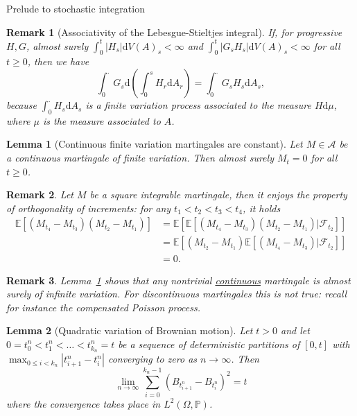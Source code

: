 \documentclass[a4paper]{article}
\theoremstyle{mytheoremstyle}
\newtheorem{lemma}{Lemma}
\newtheorem*{remark}{Remark}
\newcommand{\1}{\mathds{1}}
\begin{document}
\begin{multicols*}{3}
\begin{roundbox}{Prelude to stochastic integration}
\begin{remark}[Associativity of the Lebesgue-Stieltjes integral]
  \label{rem:associativity.lebesgue-stieltjes}If, for progressive $H, G$,
  almost surely $\int_0^t |H_s | \mathrm{d} V (A)_s < \infty$ and $\int_0^t |G_s
  H_s | \mathrm{d} V (A)_s < \infty$ for all $t \geqslant 0$, then we have
  \[ \int_0^{\cdot} G_s \mathrm{d} \left( \int_0^s H_r \mathrm{d} A_r \right) =
     \int_0^{\cdot} G_s H_s \mathrm{d} A_s, \]
  because $\int_0^{\cdot} H_s \mathrm{d} A_s$ is a finite variation process
  associated to the measure $H \mathrm{d} \mu$, where $\mu$ is the measure
  associated to $A$.
\end{remark}

\begin{lemma}[Continuous finite variation martingales are constant]
  \label{lem:mart not fv}Let $M \in \mathcal{A}$ be a continuous martingale of
  finite variation. Then almost surely $M_t = 0$ for all $t \geqslant 0$.
\end{lemma}

\begin{remark}
  \label{rem:mart.orthogonal.increments}Let $M$ be a square integrable
  martingale, then it enjoys the property of \textit{orthogonality of
  increments}: for any $t_1 < t_2 < t_3 < t_4$, it holds
  {
  \small
  \begin{align*}
    \mathbb{E} [(M_{t_4} - M_{t_3}) (M_{t_2} - M_{t_1})] & =\mathbb{E}
    [\mathbb{E} [(M_{t_4} - M_{t_3}) (M_{t_2} - M_{t_1}) |
    \mathcal{F}_{t_2}]]\\
    & =\mathbb{E} [(M_{t_2} - M_{t_1}) \mathbb{E} [(M_{t_4} - M_{t_3}) |
    \mathcal{F}_{t_2}]]\\
    & = 0.
  \end{align*}
  }
\end{remark}

\begin{remark}
  Lemma~\ref{lem:mart not fv} shows that any nontrivial
  {\underline{continuous}} martingale is almost surely of infinite variation.
  For discontinuous martingales this is not true: recall for instance the
  compensated Poisson process.
\end{remark}

\begin{lemma}[Quadratic variation of Brownian motion]
  \label{lem:Brownian-qv}Let $t > 0$ and let $0 = t^n_0 < t^n_1 < \ldots <
  t^n_{k_n} = t$ be a sequence of deterministic partitions of $[0, t]$ with
  $\max_{0 \leqslant i < k_n} |t^n_{i + 1} - t^n_i |$ converging to zero as $n
  \rightarrow \infty$. Then
  \[ \lim_{n \rightarrow \infty}  \sum_{i = 0}^{k_n - 1} (B_{t^n_{i + 1}} -
     B_{t^n_i})^2 = t \]
  where the convergence takes place in $L^2 (\Omega, \mathbb{P})$.
  

\end{lemma}
\end{roundbox}
\end{multicols*}
\end{document}
